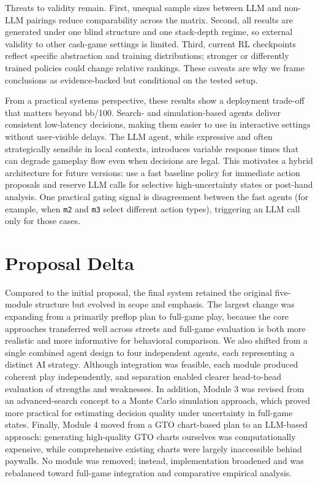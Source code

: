 \documentclass[11pt]{article}
\begin{document}
Threats to validity remain. First, unequal sample sizes between LLM and non-LLM pairings reduce comparability across the matrix. Second, all results are generated under one blind structure and one stack-depth regime, so external validity to other cash-game settings is limited. Third, current RL checkpoints reflect specific abstraction and training distributions; stronger or differently trained policies could change relative rankings. These caveats are why we frame conclusions as evidence-backed but conditional on the tested setup.

From a practical systems perspective, these results show a deployment trade-off that matters beyond bb/100. Search- and simulation-based agents deliver consistent low-latency decisions, making them easier to use in interactive settings without user-visible delays. The LLM agent, while expressive and often strategically sensible in local contexts, introduces variable response times that can degrade gameplay flow even when decisions are legal. This motivates a hybrid architecture for future versions: use a fast baseline policy for immediate action proposals and reserve LLM calls for selective high-uncertainty states or post-hand analysis. One practical gating signal is disagreement between the fast agents (for example, when \texttt{m2} and \texttt{m3} select different action types), triggering an LLM call only for those cases.

\section{Proposal Delta}
Compared to the initial proposal, the final system retained the original five-module structure but evolved in scope and emphasis. The largest change was expanding from a primarily preflop plan to full-game play, because the core approaches transferred well across streets and full-game evaluation is both more realistic and more informative for behavioral comparison. We also shifted from a single combined agent design to four independent agents, each representing a distinct AI strategy. Although integration was feasible, each module produced coherent play independently, and separation enabled clearer head-to-head evaluation of strengths and weaknesses. In addition, Module 3 was revised from an advanced-search concept to a Monte Carlo simulation approach, which proved more practical for estimating decision quality under uncertainty in full-game states. Finally, Module 4 moved from a GTO chart-based plan to an LLM-based approach: generating high-quality GTO charts ourselves was computationally expensive, while comprehensive existing charts were largely inaccessible behind paywalls. No module was removed; instead, implementation broadened and was rebalanced toward full-game integration and comparative empirical analysis.
\end{document}
